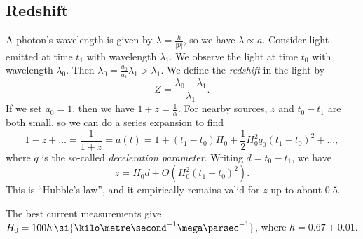 \documentclass{jknotes}
\begin{document}
\subsection{Redshift}
A photon's wavelength is given by \(\lambda = \frac{h}{|p|}\), so we have \(\lambda \propto a\). Consider light emitted at time \(t_1\) with wavelength \(\lambda_1\). We observe the light at time \(t_0\) with wavelength \(\lambda_0\). Then \(\lambda_0=\frac{a_0}{a_1}\lambda_1 > \lambda_1\). We define the \emph{redshift} in the light by
\begin{equation}
    Z = \frac{\lambda_0-\lambda_1}{\lambda_1}.
\end{equation}
If we set \(a_0=1\), then we have \(1+z=\frac{1}{\alpha}\). For nearby sources, \(z\) and \(t_0-t_1\) are both small, so we can do a series expansion to find
\begin{equation}
    1 - z + \dots = \frac{1}{1+z} = a(t) = 1 + (t_1-t_0)H_0 + \frac{1}{2}H_0^2q_0(t_1-t_0)^2+\dots,
\end{equation}
where \(q\) is the so-called \emph{deceleration parameter}. Writing \(d=t_0-t_1\), we have
\begin{equation}
    z = H_0d + O(H_0^2(t_1-t_0)^2).
\end{equation}
This is ``Hubble's law'', and it empirically remains valid for \(z\) up to about \(0.5\).
\begin{figure}[H]
    \centering
\end{figure}
The best current measurements give \(H_0=100h\,\si{\kilo\metre\second^{-1}\mega\parsec^{-1}}\), where \(h=0.67\pm0.01\).
\end{document}
